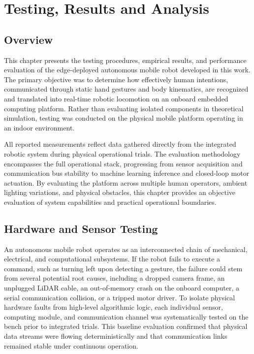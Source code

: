 \chapter{Testing, Results and Analysis}

\section{Overview}
This chapter presents the testing procedures, empirical results, and performance evaluation of the edge-deployed autonomous mobile robot developed in this work. The primary objective was to determine how effectively human intentions, communicated through static hand gestures and body kinematics, are recognized and translated into real-time robotic locomotion on an onboard embedded computing platform. Rather than evaluating isolated components in theoretical simulation, testing was conducted on the physical mobile platform operating in an indoor environment.

All reported measurements reflect data gathered directly from the integrated robotic system during physical operational trials. The evaluation methodology encompasses the full operational stack, progressing from sensor acquisition and communication bus stability to machine learning inference and closed-loop motor actuation. By evaluating the platform across multiple human operators, ambient lighting variations, and physical obstacles, this chapter provides an objective evaluation of system capabilities and practical operational boundaries.

\section{Hardware and Sensor Testing}
An autonomous mobile robot operates as an interconnected chain of mechanical, electrical, and computational subsystems. If the robot fails to execute a command, such as turning left upon detecting a gesture, the failure could stem from several potential root causes, including a dropped camera frame, an unplugged LiDAR cable, an out-of-memory crash on the onboard computer, a serial communication collision, or a tripped motor driver. To isolate physical hardware faults from high-level algorithmic logic, each individual sensor, computing module, and communication channel was systematically tested on the bench prior to integrated trials. This baseline evaluation confirmed that physical data streams were flowing deterministically and that communication links remained stable under continuous operation.


